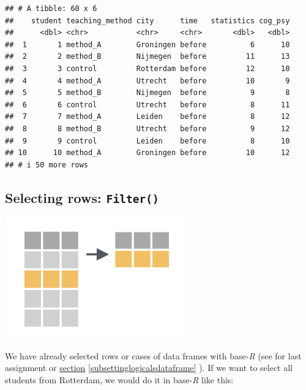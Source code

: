 \documentclass[
]{scrartcl}
\newenvironment{Shaded}{\begin{snugshade}}{\end{snugshade}}
\newcommand{\NormalTok}[1]{#1}
\newcommand{\SpecialCharTok}[1]{\textcolor[rgb]{0.81,0.36,0.00}{\textbf{#1}}}
\newcommand{\StringTok}[1]{\textcolor[rgb]{0.31,0.60,0.02}{#1}}
\begin{document}
\begin{verbatim}
## # A tibble: 60 x 6
##    student teaching_method city      time   statistics cog_psy
##      <dbl> <chr>           <chr>     <chr>       <dbl>   <dbl>
##  1       1 method_A        Groningen before          6      10
##  2       2 method_B        Nijmegen  before         11      13
##  3       3 control         Rotterdam before         12      10
##  4       4 method_A        Utrecht   before         10       9
##  5       5 method_B        Nijmegen  before          9       8
##  6       6 control         Utrecht   before          8      11
##  7       7 method_A        Leiden    before          8      12
##  8       8 method_B        Utrecht   before          9      12
##  9       9 control         Leiden    before          8      10
## 10      10 method_A        Groningen before         10      12
## # i 50 more rows
\end{verbatim}

\subsection{\texorpdfstring{Selecting rows: \texttt{Filter()}}{Selecting rows: Filter()}}\label{selecting-rows-filter}

\begin{center}\includegraphics[width=300px]{images/dplyr-filter} \end{center}

We have already selected rows or cases of data frames with base-\emph{R} (see for last assignment or \hyperref[subsettinglogicalsdataframe]{section} \ref{subsettinglogicalsdataframe} ). If we want to select all students from Rotterdam, we would do it in base-\emph{R} like this:

\begin{Shaded}
\end{Shaded}
\end{document}
